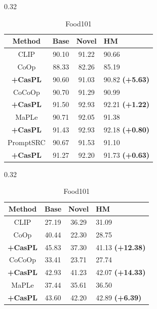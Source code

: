 \documentclass[runningheads]{llncs}
\newcommand{\improve}[1]{\textcolor{boost_line}{\textbf{#1}}}
\begin{document}
{{\begin{table}[!t]
    \begin{subtable}[t]{0.32\linewidth}
        \resizebox{0.96\linewidth}{!}
        {
        \begin{tabular}{c|ccl}
            \hline
            Method    & Base  & Novel & HM \\
            \hline
            CLIP & 90.10 & 91.22 & 90.66 \\
            \hline
            CoOp & 88.33 & 82.26 & 85.19 \\
            \rowcolor{tablecolor} \textbf{+CasPL} &90.60 	&91.03 	&90.82    \improve{(+5.63)}   \\
            \hline
            CoCoOp & 90.70 & 91.29 & 90.99 \\
            \rowcolor{tablecolor} \textbf{+CasPL} &91.50 	&92.93 	&92.21   \improve{(+1.22)}  \\
            \hline
            MaPLe & 90.71 & 92.05 & 91.38 \\
            \rowcolor{tablecolor} \textbf{+CasPL} &91.43 	&92.93 	&92.18  \improve{(+0.80)}  \\
            \hline
            PromptSRC & 90.67 & 91.53 & 91.10 \\
            \rowcolor{tablecolor} \textbf{+CasPL} &91.27 	&92.20 	&91.73  \improve{(+0.63)}  \\
            \hline
        \end{tabular}
        }
        \caption{Food101}
    \end{subtable}
    \begin{subtable}[t]{0.32\linewidth}
        \resizebox{0.96\linewidth}{!}
        {
        \begin{tabular}{c|ccl}
            \hline
            Method    & Base  & Novel & HM \\
            \hline
            CLIP & 27.19 & 36.29 & 31.09 \\
            \hline
            CoOp & 40.44 & 22.30 & 28.75 \\
            \rowcolor{tablecolor} \textbf{+CasPL} &45.83 	&37.30 	&41.13     \small\improve{(+12.38)}  \\
            \hline
            CoCoOp & 33.41 & 23.71 & 27.74 \\
            \rowcolor{tablecolor} \textbf{+CasPL} &42.93 	&41.23 	&42.07    \small\improve{(+14.33)} \\
            \hline
            MaPLe & 37.44 & 35.61 & 36.50 \\
            \rowcolor{tablecolor} \textbf{+CasPL} &43.60 	&42.20 	&42.89   \improve{(+6.39)}  \\

\end{tabular}}
\end{subtable}
\end{table}}}
\end{document}
